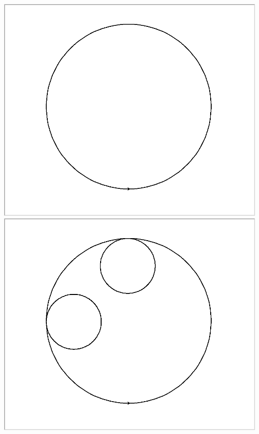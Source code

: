 \documentclass[11pt,class=report,crop=false]{standalone}
\begin{document}
\begin{activite}
\begin{enumerate}
  \begin{center}
\includegraphics[scale=\myscale,scale=0.14]{ecran_tortue_cercle1}\quad 
\includegraphics[scale=\myscale,scale=0.14]{ecran_tortue_cercle2}\quad

\end{center}
\end{enumerate}
\end{activite}
\end{document}
